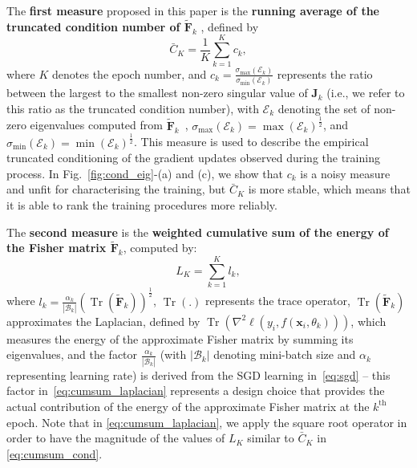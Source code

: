 \documentclass[10pt,journal,compsoc]{IEEEtran}
\DeclareMathOperator{\Tr}{Tr}
\begin{document}
The {\bf first measure} proposed in this paper is the {\bf running average of the truncated condition number of $\widetilde{\mathbf{F}}_k$} , defined by
\begin{equation}
\bar{C}_K = \frac{1}{K}\sum_{k = 1}^K c_k,
\label{eq:cumsum_cond}
\end{equation}
where $K$ denotes the epoch number, and $c_k = \frac{\sigma_{\text{max}}({\mathcal{E}_k})}{\sigma_{\text{min}}({\mathcal{E}_k})}$ represents the ratio between the largest to the smallest non-zero singular value of $\mathbf{J}_k$ (i.e., we refer to this ratio as the truncated condition number),
with $\mathcal{E}_k$ denoting the set of non-zero eigenvalues computed from $\widetilde{\mathbf{F}}_k$~\cite{wilkinson1965algebraic},  $\sigma_{\text{max}}({\mathcal{E}_k})=\max(\mathcal{E}_k)^{\frac{1}{2}}$, and
$\sigma_{\text{min}}({\mathcal{E}_k})=\min(\mathcal{E}_k)^{\frac{1}{2}}$.  This measure is used to describe the empirical truncated conditioning of the gradient updates observed during the training process.
In Fig.~\ref{fig:cond_eig}-(a) and (c), we show that $c_k$ is a noisy measure and unfit for characterising the training, but $\bar{C}_K$ is more stable, which means that it is able to rank the training procedures more reliably. 


The {\bf second measure} is the {\bf weighted cumulative sum of the energy of the Fisher matrix $\widetilde{\mathbf{F}}_k$}, computed by:
\begin{equation}
L_K  = \sum_{k = 1}^K l_k,
\label{eq:cumsum_laplacian}
\end{equation}
where $l_k  = \frac{\alpha_k}{|\mathcal{B}_k|} \left ( \Tr \left ( \widetilde{\mathbf{F}}_k \right ) \right )^{\frac{1}{2}}$,
$\Tr(.)$ represents the trace operator, $\Tr ( \widetilde{\mathbf{F}}_k ) $ approximates the Laplacian, defined by $ \Tr \left ( \nabla^2 \ell(y_i,f(\mathbf{x}_i,\theta_k)) \right ) $, which measures the energy of the approximate Fisher matrix by summing its eigenvalues, and the factor $\frac{\alpha_k}{|\mathcal{B}_k|}$ (with $|\mathcal{B}_k|$ denoting mini-batch size and $\alpha_k$ representing learning rate) is derived from the SGD learning in~\eqref{eq:sgd} -- this factor in~\eqref{eq:cumsum_laplacian} represents a design choice that provides the actual contribution of the energy of the approximate Fisher matrix at the $k^{\text{th}}$ epoch.
Note that in \eqref{eq:cumsum_laplacian}, we apply the square root operator in order to have the magnitude of the values of $L_K$ similar to $\bar{C}_K$ in \eqref{eq:cumsum_cond}.  
\end{document}
